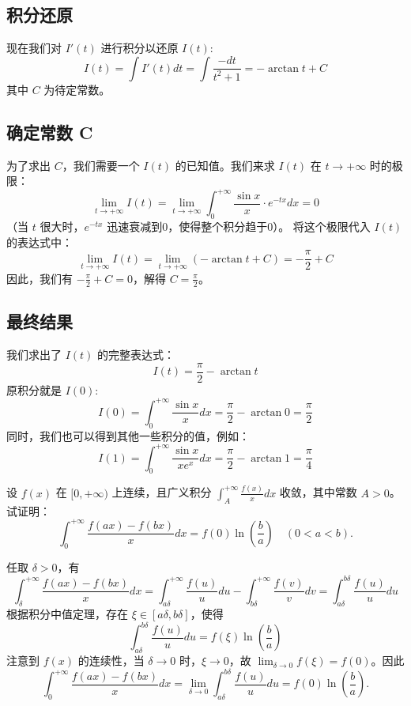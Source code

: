 \documentclass[lang=cn,newtx,10pt,scheme=chinese]{elegantbook}
\begin{document}
\subsection*{积分还原}
现在我们对 $I'(t)$ 进行积分以还原 $I(t)$:
\begin{equation}
I(t) = \int I'(t) dt = \int \frac{-dt}{t^2 + 1} = -\arctan t + C
\end{equation}
其中 $C$ 为待定常数。

\subsection*{确定常数 C}
为了求出 $C$，我们需要一个 $I(t)$ 的已知值。我们来求 $I(t)$ 在 $t \to +\infty$ 时的极限：
\begin{equation}
\lim_{t \to +\infty} I(t) = \lim_{t \to +\infty} \int_{0}^{+\infty} \frac{\sin x}{x} \cdot e^{-tx} dx = 0
\end{equation}
（当 $t$ 很大时，$e^{-tx}$ 迅速衰减到0，使得整个积分趋于0）。
将这个极限代入 $I(t)$ 的表达式中：
\begin{equation}
\lim_{t \to +\infty} I(t) = \lim_{t \to +\infty} (-\arctan t + C) = -\frac{\pi}{2} + C
\end{equation}
因此，我们有 $-\frac{\pi}{2} + C = 0$，解得 $C = \frac{\pi}{2}$。

\subsection*{最终结果}
我们求出了 $I(t)$ 的完整表达式：
\begin{equation}
I(t) = \frac{\pi}{2} - \arctan t
\end{equation}
原积分就是 $I(0)$:
\begin{equation}
I(0) = \int_{0}^{+\infty} \frac{\sin x}{x} dx = \frac{\pi}{2} - \arctan 0 = \frac{\pi}{2}
\end{equation}
同时，我们也可以得到其他一些积分的值，例如：
\begin{equation}
I(1) = \int_{0}^{+\infty} \frac{\sin x}{x e^x} dx = \frac{\pi}{2} - \arctan 1 = \frac{\pi}{4}
\end{equation}

\begin{example}[傅汝兰尼积分的证明]
设 $f(x)$ 在 $[0, +\infty)$ 上连续，且广义积分 $\int_A^{+\infty} \frac{f(x)}{x} dx$ 收敛，其中常数 $A > 0$。试证明：
$$
\int_0^{+\infty} \frac{f(ax) - f(bx)}{x} dx = f(0) \ln\left(\frac{b}{a}\right) \quad (0 < a < b).
$$
\end{example}
\begin{solution}
任取 $\delta > 0$，有
$$
\int_\delta^{+\infty} \frac{f(ax) - f(bx)}{x} dx = \int_{a\delta}^{+\infty} \frac{f(u)}{u}du - \int_{b\delta}^{+\infty} \frac{f(v)}{v}dv = \int_{a\delta}^{b\delta} \frac{f(u)}{u}du
$$
根据积分中值定理，存在 $\xi \in [a\delta, b\delta]$，使得
$$
\int_{a\delta}^{b\delta} \frac{f(u)}{u}du = f(\xi) \ln\left(\frac{b}{a}\right)
$$
注意到 $f(x)$ 的连续性，当 $\delta \to 0$ 时，$\xi \to 0$，故 $\lim_{\delta \to 0} f(\xi) = f(0)$。因此
$$
\int_0^{+\infty} \frac{f(ax) - f(bx)}{x} dx = \lim_{\delta \to 0} \int_{a\delta}^{b\delta} \frac{f(u)}{u}du = f(0) \ln\left(\frac{b}{a}\right).
$$
\end{solution}
\end{document}
